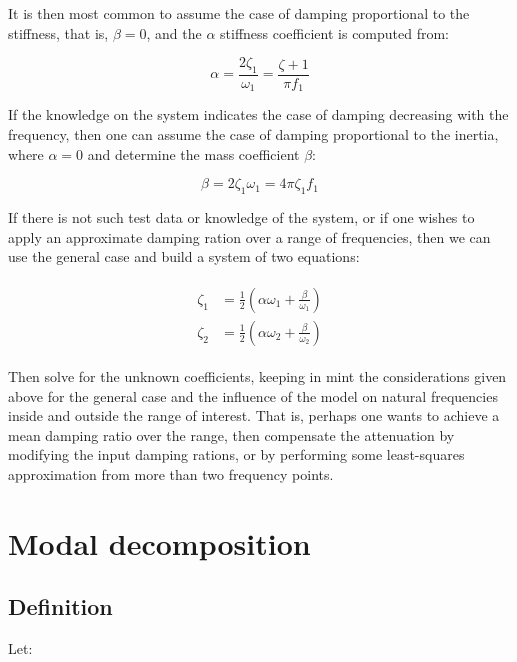 \documentclass[10pt,b5paper,titlepage]{book}
\newenvironment{ematrix}
{
    \begin{eqnarray}
        \begin{aligned}
}
{
        \end{aligned}
    \end{eqnarray}
}
\begin{document}
It is then most common to assume the case of damping proportional to the stiffness,
that is, $ \beta = 0 $, and the $ \alpha $ stiffness coefficient is computed from:

\begin{equation}
    \alpha = \frac{2 \zeta_1}{\omega_1} = \frac{\zeta+1}{\pi f_1}
\end{equation}

If the knowledge on the system indicates the case of damping decreasing with the
frequency, then one can assume the case of damping proportional to the inertia,
where $ \alpha = 0 $ and determine the mass coefficient $ \beta $:

\begin{equation}
    \beta = 2 \zeta_1 \omega_1 = 4 \pi \zeta_1 f_1
\end{equation}

If there is not such test data or knowledge of the system, or if one wishes to apply
an approximate damping ration over a range of frequencies, then we can use the
general case and build a system of two equations:

\begin{ematrix}
    \zeta_1 &= \frac{1}{2} \left( \alpha \omega_1 + \frac{\beta}{\omega_1} \right)\\
    \zeta_2 &= \frac{1}{2} \left( \alpha \omega_2 + \frac{\beta}{\omega_2} \right)
\end{ematrix}

Then solve for the unknown coefficients, keeping in mint the considerations given
above for the general case and the influence of the model on natural frequencies
inside and outside the range of interest. That is, perhaps one wants to achieve
a mean damping ratio over the range, then compensate the attenuation by modifying
the input damping rations, or by performing some least-squares approximation from
more than two frequency points.







\newpage
\section{Modal decomposition}

\subsection{Definition}

Let:
\end{document}
